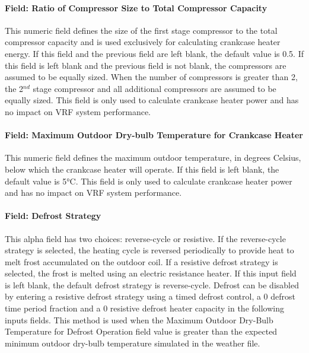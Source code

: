 \paragraph{Field: Ratio of Compressor Size to Total Compressor Capacity}

This numeric field defines the size of the first stage compressor to the total compressor capacity and is used exclusively for calculating crankcase heater energy. If this field and the previous field are left blank, the default value is 0.5. If this field is left blank and the previous field is not blank, the compressors are assumed to be equally sized. When the number of compressors is greater than 2, the 2\(^{nd}\) stage compressor and all additional compressors are assumed to be equally sized. This field is only used to calculate crankcase heater power and has no impact on VRF system performance.

\paragraph{Field: Maximum Outdoor Dry-bulb Temperature for Crankcase Heater}

This numeric field defines the maximum outdoor temperature, in degrees Celsius, below which the crankcase heater will operate. If this field is left blank, the default value is 5°C. This field is only used to calculate crankcase heater power and has no impact on VRF system performance.

\paragraph{Field: Defrost Strategy}

This alpha field has two choices: reverse-cycle or resistive. If the reverse-cycle strategy is selected, the heating cycle is reversed periodically to provide heat to melt frost accumulated on the outdoor coil. If a resistive defrost strategy is selected, the frost is melted using an electric resistance heater. If this input field is left blank, the default defrost strategy is reverse-cycle. Defrost can be disabled by entering a resistive defrost strategy using a timed defrost control, a 0 defrost time period fraction and a 0 resistive defrost heater capacity in the following inputs fields. This method is used when the Maximum Outdoor Dry-Bulb Temperature for Defrost Operation field value is greater than the expected minimum outdoor dry-bulb temperature simulated in the weather file.

